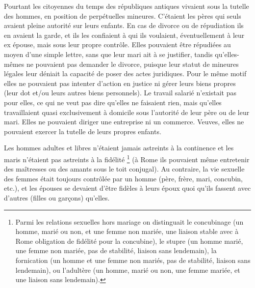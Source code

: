 Pourtant les citoyennes du temps des républiques antiques vivaient sous la
tutelle des hommes, en position de perpétuelles mineures. C'étaient les pères qui seuls avaient pleine autorité
sur leurs enfants. En cas de divorce ou de répudiation ils en avaient la
garde, et ils les confiaient à qui ils voulaient, éventuellement à leur ex
épouse, mais sous leur propre contrôle. Elles pouvaient
être répudiées au moyen d'une simple lettre, sans que leur mari ait
à se justifier, tandis qu'elles-mêmes ne pouvaient pas demander le divorce,
puisque leur statut de mineures légales leur déniait la capacité de poser des actes juridiques. Pour le même motif elles ne pouvaient
pas intenter d'action en justice ni gérer leurs biens propres
(leur dot et/ou leurs autres biens personnels). Le travail salarié
n'existait pas pour elles, ce qui ne veut pas dire qu'elles ne faisaient
rien, mais qu'elles travaillaient quasi exclusivement
à domicile sous l'autorité de leur père ou de leur mari.  Elles ne pouvaient
diriger une entreprise ni un commerce. Veuves, elles ne pouvaient
exercer la tutelle de leurs propres enfants. 

Les hommes adultes et libres n'étaient jamais astreints à la continence
et les maris n'étaient pas astreints à la fidélité%
\footnote{Parmi les relations sexuelles hors mariage on distinguait le concubinage (un homme, marié ou non, et une
femme non mariée, une liaison stable avec à Rome obligation de fidélité pour la concubine), le stupre (un homme 
marié, une femme non mariée, pas de stabilité, liaison sans lendemain), la fornication (un homme et une femme 
non mariés, pas de stabilité, liaison sans lendemain), ou l'adultère (un homme, marié ou non, une femme mariée, 
et une liaison sans lendemain).}
(à Rome ils pouvaient
même entretenir des maîtresses ou des amants sous le toit conjugal).
Au contraire, la vie sexuelle des femmes était toujours contrôlée par
un homme (père, frère, mari, concubin, etc.), et les épouses se devaient
d'être fidèles à leurs époux quoi qu'ils fassent avec d'autres (filles ou garçons)
qu'elles.

